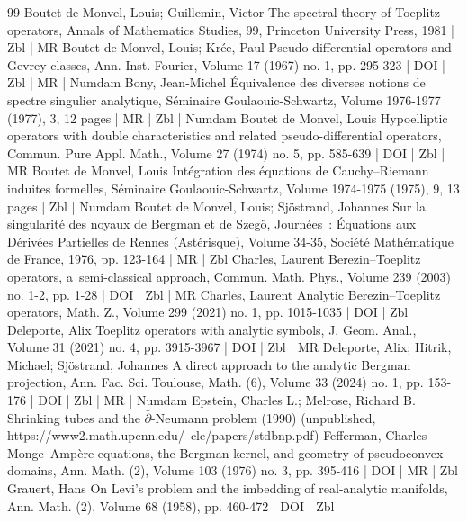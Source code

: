 \begin{thebibliography}{99}
Boutet de Monvel, Louis; Guillemin, Victor The spectral theory of Toeplitz operators, Annals of Mathematics Studies, 99, Princeton University Press, 1981 | Zbl | MR
Boutet de Monvel, Louis; Krée, Paul Pseudo-differential operators and Gevrey classes, Ann. Inst. Fourier, Volume 17 (1967) no. 1, pp. 295-323 | DOI | Zbl | MR | Numdam
Bony, Jean-Michel Équivalence des diverses notions de spectre singulier analytique, Séminaire Goulaouic-Schwartz, Volume 1976-1977 (1977), 3, 12 pages | MR | Zbl | Numdam
Boutet de Monvel, Louis Hypoelliptic operators with double characteristics and related pseudo-differential operators, Commun. Pure Appl. Math., Volume 27 (1974) no. 5, pp. 585-639 | DOI | Zbl | MR
Boutet de Monvel, Louis Intégration des équations de Cauchy–Riemann induites formelles, Séminaire Goulaouic-Schwartz, Volume 1974-1975 (1975), 9, 13 pages | Zbl | Numdam
Boutet de Monvel, Louis; Sjöstrand, Johannes Sur la singularité des noyaux de Bergman et de Szegö, Journées : Équations aux Dérivées Partielles de Rennes (Astérisque), Volume 34-35, Société Mathématique de France, 1976, pp. 123-164 | MR | Zbl
Charles, Laurent Berezin–Toeplitz operators, a semi-classical approach, Commun. Math. Phys., Volume 239 (2003) no. 1-2, pp. 1-28 | DOI | Zbl | MR
Charles, Laurent Analytic Berezin–Toeplitz operators, Math. Z., Volume 299 (2021) no. 1, pp. 1015-1035 | DOI | Zbl
Deleporte, Alix Toeplitz operators with analytic symbols, J. Geom. Anal., Volume 31 (2021) no. 4, pp. 3915-3967 | DOI | Zbl | MR
Deleporte, Alix; Hitrik, Michael; Sjöstrand, Johannes A direct approach to the analytic Bergman projection, Ann. Fac. Sci. Toulouse, Math. (6), Volume 33 (2024) no. 1, pp. 153-176 | DOI | Zbl | MR | Numdam
Epstein, Charles L.; Melrose, Richard B. Shrinking tubes and the $\bar{ \partial }$-Neumann problem (1990) (unpublished, https://www2.math.upenn.edu/~cle/papers/stdbnp.pdf)
Fefferman, Charles Monge–Ampère equations, the Bergman kernel, and geometry of pseudoconvex domains, Ann. Math. (2), Volume 103 (1976) no. 3, pp. 395-416 | DOI | MR | Zbl
Grauert, Hans On Levi’s problem and the imbedding of real-analytic manifolds, Ann. Math. (2), Volume 68 (1958), pp. 460-472 | DOI | Zbl

\end{thebibliography}
